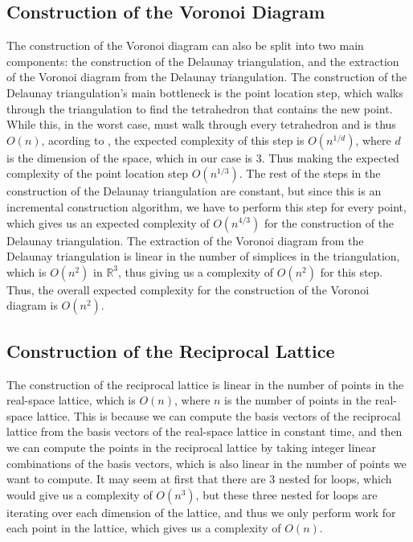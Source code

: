 \documentclass{article}
\begin{document}
\subsection{Construction of the Voronoi Diagram}
The construction of the Voronoi diagram can also be split into two main components: the construction of the Delaunay triangulation, and the extraction of the Voronoi diagram from the Delaunay triangulation. The construction of the Delaunay triangulation's main bottleneck is the point location step, which walks through the triangulation to find the tetrahedron that contains the new point. While this, in the worst case, must walk through every tetrahedron and is thus $O(n)$, acording to \cite{muckeFastRandomizedPoint}, the expected complexity of this step is $O(n^{1/d})$, where $d$ is the dimension of the space, which in our case is 3. Thus making the expected complexity of the point location step $O(n^{1/3})$. The rest of the steps in the construction of the Delaunay triangulation are constant, but since this is an incremental construction algorithm, we have to perform this step for every point, which gives us an expected complexity of $O(n^{4/3})$ for the construction of the Delaunay triangulation. The extraction of the Voronoi diagram from the Delaunay triangulation is linear in the number of simplices in the triangulation, which is $O(n^2)$ in $\mathbb{R}^3$, thus giving us a complexity of $O(n^2)$ for this step. Thus, the overall expected complexity for the construction of the Voronoi diagram is $O(n^2)$.

\subsection{Construction of the Reciprocal Lattice}
The construction of the reciprocal lattice is linear in the number of points in the real-space lattice, which is $O(n)$, where $n$ is the number of points in the real-space lattice. This is because we can compute the basis vectors of the reciprocal lattice from the basis vectors of the real-space lattice in constant time, and then we can compute the points in the reciprocal lattice by taking integer linear combinations of the basis vectors, which is also linear in the number of points we want to compute. It may seem at first that there are 3 nested for loops, which would give us a complexity of $O(n^3)$, but these three nested for loops are iterating over each dimension of the lattice, and thus we only perform work for each point in the lattice, which gives us a complexity of $O(n)$.
\end{document}
